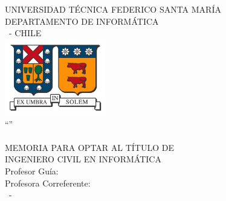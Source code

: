 \begin{titlepage}
\begin{center}
\noindent
{\fontsize{18}{22}\selectfont UNIVERSIDAD TÉCNICA FEDERICO SANTA MARÍA \\}
{\fontsize{16}{19}\selectfont DEPARTAMENTO DE INFORMÁTICA \\}
{\fontsize{16}{19}\selectfont \MakeUppercase{\ciudad}\ - CHILE \\}
\vspace{1.5cm}
\includegraphics[width=4.41cm,height=3.34cm]{logo/logo.jpg} \\
\vspace{1.5cm}
{\fontsize{20}{24}\selectfont ``\MakeUppercase{\titulo}'' \\}
\vfill
{\fontsize{16}{19}\selectfont \MakeUppercase{\nombrealumno} \\}
\vfill
{\fontsize{16}{19}\selectfont MEMORIA PARA OPTAR AL TÍTULO DE \\}
{\fontsize{16}{19}\selectfont INGENIERO CIVIL EN INFORMÁTICA \\}
\vspace{1.5cm}
{\fontsize{14}{17}\selectfont Profesor Guía: \nombreprofesor \\}
{\fontsize{14}{17}\selectfont Profesora Correferente: \nombrecorreferente \\}
\vspace{2.5cm}
{\fontsize{14}{17}\selectfont \mesexamen\ - \anioexamen \\}
\end{center}
\end{titlepage}

